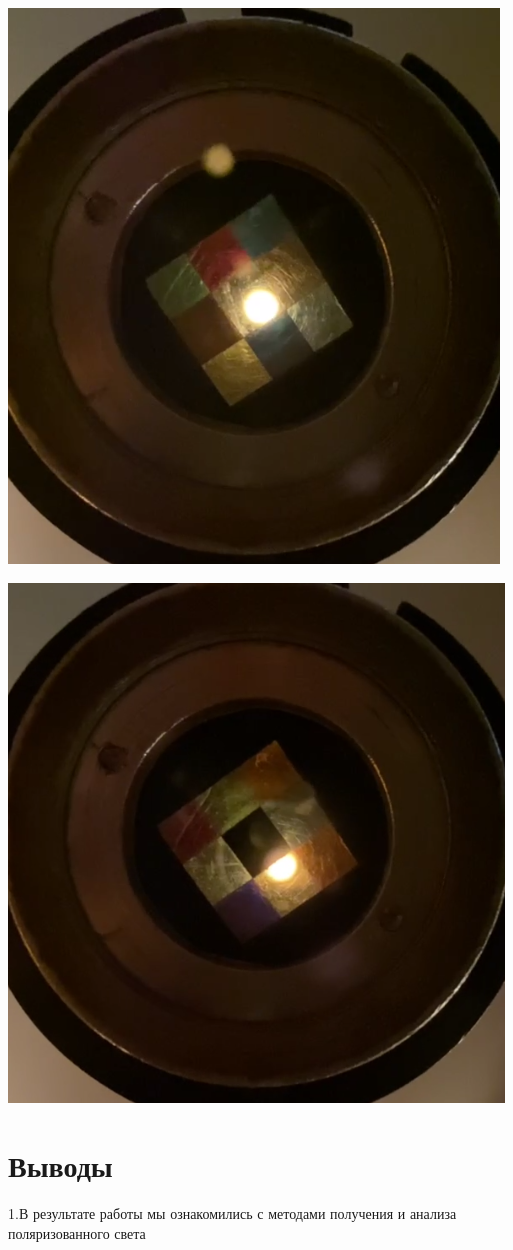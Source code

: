 \documentclass[a4paper,12pt]{article}
\begin{document}
\begin{minipage}{.49\textwidth}
  \begin{center}
 	\includegraphics[width=0.6\linewidth]{fig4}
  \end{center}
\end{minipage}
\begin{minipage}{.49\textwidth}
	\begin{center}
 		 \includegraphics[width=0.6\linewidth]{fig5}
  	\end{center}
\end{minipage}


\section*{Выводы}
1.В результате работы мы ознакомились с методами получения и анализа поляризованного света
\end{document}
